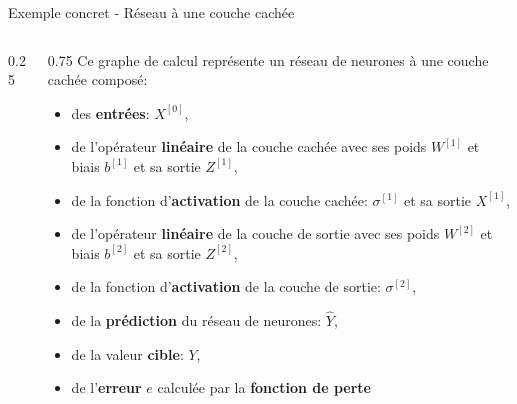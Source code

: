 \begin{frame}{Exemple concret - Réseau à une couche cachée}
\begin{columns}
\begin{column}{0.25\textwidth}
\begin{center}
{\begin{tikzpicture}
					\end{tikzpicture}
				}
			\end{center}
		\end{column}
		\begin{column}{0.75\textwidth}
			Ce graphe de calcul représente un réseau de neurones à une couche cachée composé:
			\begin{itemize}
				\item des \textbf{entrées}: $X^{[0]}$,
				\item de l'opérateur \textbf{linéaire} de la couche cachée avec ses poids $W^{[1]}$ et biais $b^{[1]}$ et sa sortie $Z^{[1]}$,
				\item de la fonction d'\textbf{activation} de la couche cachée: $\sigma^{[1]}$ et sa sortie $X^{[1]}$,
				\item de l'opérateur \textbf{linéaire} de la couche de sortie avec ses poids $W^{[2]}$ et biais $b^{[2]}$ et sa sortie $Z^{[2]}$,
				\item de la fonction d'\textbf{activation} de la couche de sortie: $\sigma^{[2]}$,
				\item de la \textbf{prédiction} du réseau de neurones: $\hat{Y}$,
				\item de la valeur \textbf{cible}: $Y$,
				\item de l'\textbf{erreur} $e$ calculée par la \textbf{fonction de perte}
			\end{itemize}
		\end{column}
	\end{columns}
\end{frame}


